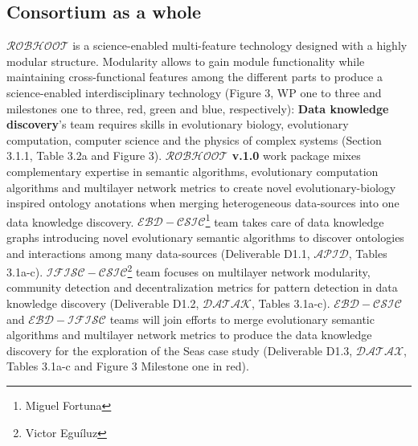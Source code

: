 \documentclass[11pt, a4paper]{article} %
\begin{document}
  \subsection{Consortium as a whole}
  {\bf $\mathcal{ROBHOOT}$} is a science-enabled multi-feature
  technology designed with a highly modular structure. Modularity
  allows to gain module functionality while maintaining
  cross-functional features among the different parts to produce a
  science-enabled interdisciplinary technology (Figure 3, WP one to
  three and milestones one to three, red, green and blue,
  respectively): {\bf Data knowledge discovery}'s team requires skills
  in evolutionary biology, evolutionary computation, computer science
  and the physics of complex systems (Section 3.1.1, Table 3.2a and
  Figure 3). {\bf $\mathcal{ROBHOOT}$ v.1.0} work package mixes
  complementary expertise in semantic algorithms, evolutionary
  computation algorithms and multilayer network metrics to create
  novel evolutionary-biology inspired ontology anotations when merging
  heterogeneous data-sources into one data knowledge discovery. {\bf
    $\mathcal{EBD-CSIC}$}\footnote{Miguel Fortuna} team takes care of
  data knowledge graphs introducing novel evolutionary semantic
  algorithms to discover ontologies and interactions among many
  data-sources (Deliverable D1.1, {\bf $\mathcal{APID}$}, Tables
  3.1a-c). {\bf $\mathcal{IFISC-CSIC}$}\footnote{Victor Egu\'iluz}
  team focuses on multilayer network modularity, community detection
  and decentralization metrics for pattern detection in data knowledge
  discovery (Deliverable D1.2, {\bf $\mathcal{DATAK}$}, Tables
  3.1a-c). {\bf $\mathcal{EBD-CSIC}$} and {\bf $\mathcal{EBD-IFISC}$}
  teams will join efforts to merge evolutionary semantic algorithms
  and multilayer network metrics to produce the data knowledge
  discovery for the exploration of the Seas case study (Deliverable
  D1.3, {\bf $\mathcal{DATAX}$}, Tables 3.1a-c and Figure 3 Milestone
  one in red).
\end{document}
